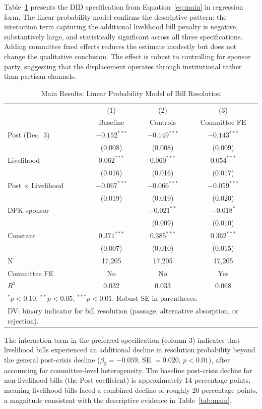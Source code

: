 \documentclass[11pt]{article}
\begin{document}
Table~\ref{tab:reg} presents the DID specification from Equation~\ref{eq:main} in regression form. The linear probability model confirms the descriptive pattern: the interaction term capturing the additional livelihood bill penalty is negative, substantively large, and statistically significant across all three specifications. Adding committee fixed effects reduces the estimate modestly but does not change the qualitative conclusion. The effect is robust to controlling for sponsor party, suggesting that the displacement operates through institutional rather than partisan channels.

\begin{table}[htbp]
\centering
\caption{Main Results: Linear Probability Model of Bill Resolution}
\label{tab:reg}
\begin{tabular}{lccc}
\toprule
 & (1) & (2) & (3) \\
 & Baseline & Controls & Committee FE \\
\midrule
Post (Dec.\ 3) & $-0.152^{***}$ & $-0.149^{***}$ & $-0.143^{***}$ \\
 & (0.008) & (0.008) & (0.009) \\
Livelihood & $0.062^{***}$ & $0.060^{***}$ & $0.054^{***}$ \\
 & (0.016) & (0.016) & (0.017) \\
Post $\times$ Livelihood & $-0.067^{***}$ & $-0.066^{***}$ & $-0.059^{***}$ \\
 & (0.019) & (0.019) & (0.020) \\
DPK sponsor & & $-0.021^{**}$ & $-0.018^{*}$ \\
 & & (0.009) & (0.010) \\
Constant & $0.371^{***}$ & $0.385^{***}$ & $0.362^{***}$ \\
 & (0.007) & (0.010) & (0.015) \\
\midrule
N & 17,205 & 17,205 & 17,205 \\
Committee FE & No & No & Yes \\
$R^2$ & 0.032 & 0.033 & 0.068 \\
\bottomrule
\multicolumn{4}{l}{\footnotesize $^{*}p<0.10$, $^{**}p<0.05$, $^{***}p<0.01$. Robust SE in parentheses.} \\
\multicolumn{4}{l}{\footnotesize DV: binary indicator for bill resolution (passage, alternative absorption, or rejection).}
\end{tabular}
\end{table}

The interaction term in the preferred specification (column 3) indicates that livelihood bills experienced an additional decline in resolution probability beyond the general post-crisis decline ($\beta_3 = -0.059$, SE $= 0.020$, $p < 0.01$), after accounting for committee-level heterogeneity. The baseline post-crisis decline for non-livelihood bills (the Post coefficient) is approximately 14 percentage points, meaning livelihood bills faced a combined decline of roughly 20 percentage points, a magnitude consistent with the descriptive evidence in Table~\ref{tab:main}.
\end{document}

